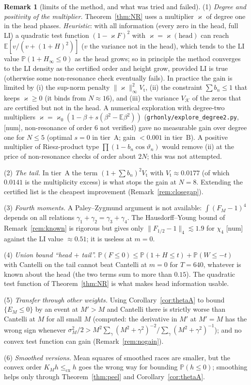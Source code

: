 \documentclass[11pt]{amsart}
\theoremstyle{definition}
\newtheorem{remark}[theorem]{Remark}
\numberwithin{equation}{section}
\newcommand{\PP}{\mathbb P}
\newcommand{\EE}{\mathbb E}
\newcommand{\cK}{\mathcal K}          %
\newcommand{\numtag}{\textsf{[num]}}
\begin{document}
\begin{remark}[limits of the method, and what was tried and failed]
\label{rem:NRlimits}
(1) \emph{Degree and positivity of the multiplier.}
Theorem~\ref{thm:NR} uses a multiplier $\varkappa$ of degree one in
the head phases. \emph{Heuristic}: with all information (every zero
in the head, full LI) a quadratic test function
$(1-\varkappa F)^2$ with $\varkappa=\varkappa(\text{head})$ can reach
$\EE[v/(v+(1+H)^2)]$ ($v$ the variance not in the head), which tends
to the LI value $\PP(1+H_\infty\le0)$ as the head grows; so in
principle the method converges to the LI density as the certified
order and height grow, provided LI is true (otherwise some
non-resonance check eventually fails). In practice the gain is
limited by (i) the sup-norm penalty
$\|\varkappa\|_\infty^2V_{\mathrm t}$, (ii) the constraint
$\sum b_n\le1$ that keeps $\varkappa\ge0$ (it binds from
$N\approx16$), and (iii) the variance $V_{\cK}$ of the zeros that are
certified but not in the head. A numerical exploration with
degree-two multipliers
$\varkappa=\varkappa_0(1-\beta+s(\beta^2-\EE\beta^2))$
(\texttt{grhonly/explore\_degree2.py}, \numtag, non-resonance of
order $6$ not verified) gave no measurable gain over degree one for
$N\le5$ (optimal $s=0$ in tier~A; gain $<0.001$ in tier~B). A
positive multiplier of Riesz-product type
$\prod(1-b_n\cos\vartheta_n)$ would remove (ii) at the price of
non-resonance checks of order about $2N$; this was not attempted.

(2) \emph{The tail.} In tier~A the term
$(1+\sum b_n)^2V_{\mathrm t}$ with $V_{\mathrm t}\approx0.0177$ (of
which $0.0141$ is the multiplicity excess) is what stops the gain at
$N=8$. Extending the certified list is the cheapest improvement
(Remark~\ref{rem:closegap}).

(3) \emph{Fourth moments.} A Paley--Zygmund argument is not
available: $\int(F_M-1)^4$ depends on all relations
$\gamma_1+\gamma_2=\gamma_3+\gamma_4$. The Hausdorff--Young bound of
Remark~\ref{rem:known} is rigorous but gives only
$\|F_{1/2}-1\|_4\lesssim1.9$ for $\chi_4$ \numtag{} against the LI
value $\approx0.51$; it is useless at $m=0$.

(4) \emph{Union bound ``head $+$ tail''.}
$\PP(F\le0)\le\PP(1+H\le t)+\PP(W\le-t)$ with Cantelli on the tail
cannot beat Cantelli at $m=0$ for $T=640$, whatever is known about
the head (the two terms sum to more than $0.15$). The quadratic test
function of Theorem~\ref{thm:NR} is what makes head information
usable.

(5) \emph{Transfer through other weights.} Using
Corollary~\ref{cor:thetaA} to bound $\{E_M\le0\}$ by an event at
$M'>M$ and Cantelli there is strictly worse than Cantelli at $M$ for
all small $M$ (computed: the derivative in $M'$ at $M'=M$ has the
wrong sign whenever
$\sigma_M^2/2>M^2\sum_\gamma(M^2+\gamma^2)^{-2}/
\sum_\gamma(M^2+\gamma^2)^{-1}$); and no convex test function can
gain (Remark~\ref{rem:nogain}).

(6) \emph{Smoothed versions.} Mean squares of smoothed races are
smaller, but the convex order $K_Mh\le_{\mathrm{cx}}h$ goes the wrong
way for bounding $\PP(h\le0)$; smoothing helps only through
Theorem~\ref{thm:peel} and Corollary~\ref{cor:thetaA}.
\end{remark}
\end{document}
